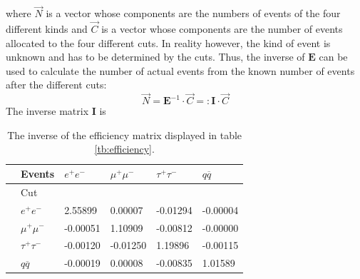 where $\vec{N}$ is a vector whose components are the numbers of events of the four different kinds and $\vec{C}$ is a vector whose components are the number of events allocated to the four different cuts. 
In reality however, the kind of event is unknown and has to be determined by the cuts. Thus, the inverse of $\boldsymbol{E}$ can be used to calculate the number of actual events from the known number of events after the different cuts:
\begin{equation}
\vec{N}=\boldsymbol{E}^{-1}\cdot\vec{C}=:\boldsymbol{I}\cdot\vec{C}
\label{eq:numberevents}
\end{equation} 
The inverse matrix $\boldsymbol{I}$ is
\begin{table}[H]\centering
	\begin{tabular}{@{}llllll@{}}
		\toprule
		&Events &$e^+e^-$&$\mu^+\mu^-$&$\tau^+\tau^-$&$q\overline{q}$\\
		\midrule
		&Cut&&&&\\
		&$e^+e^-$&2.55899&0.00007&-0.01294&-0.00004\\
		&$\mu^+\mu^-$&-0.00051&1.10909&-0.00812&-0.00000\\
		&$\tau^+\tau^-$&-0.00120&-0.01250&1.19896&-0.00115\\
		&$q\overline{q}$&-0.00019&0.00008&-0.00835&1.01589\\
		\bottomrule
	\end{tabular}
	\caption[Inverse efficiency matrix]{The inverse of the efficiency matrix displayed in table \ref{tb:efficiency}.}
	\label{tb:invefficiency}
\end{table}

